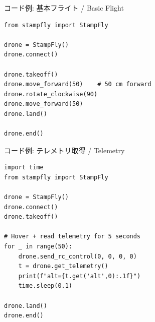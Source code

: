 \begin{frame}[fragile]{コード例: 基本フライト / Basic Flight}
  \begin{lstlisting}[style=sfpython, title={flight\_basic.py}]
from stampfly import StampFly

drone = StampFly()
drone.connect()

drone.takeoff()
drone.move_forward(50)    # 50 cm forward
drone.rotate_clockwise(90)
drone.move_forward(50)
drone.land()

drone.end()
  \end{lstlisting}
\end{frame}

\begin{frame}[fragile]{コード例: テレメトリ取得 / Telemetry}
  \begin{lstlisting}[style=sfpython, title={flight\_telemetry.py}]
import time
from stampfly import StampFly

drone = StampFly()
drone.connect()
drone.takeoff()

# Hover + read telemetry for 5 seconds
for _ in range(50):
    drone.send_rc_control(0, 0, 0, 0)
    t = drone.get_telemetry()
    print(f"alt={t.get('alt',0):.1f}")
    time.sleep(0.1)

drone.land()
drone.end()
  \end{lstlisting}
\end{frame}


